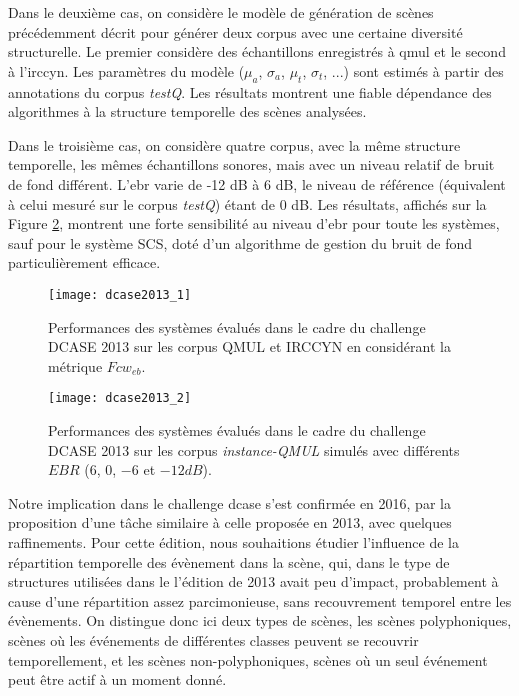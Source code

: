 Dans le deuxième cas, on considère le modèle de génération de scènes précédemment décrit pour générer deux corpus avec une certaine diversité structurelle. Le premier considère des échantillons enregistrés à qmul et le second à l'irccyn. Les paramètres du modèle ($\mu_a$, $\sigma_a$, $\mu_t$, $\sigma_t$, ...) sont estimés à partir des annotations du corpus \emph{testQ}. Les résultats montrent une fiable dépendance des algorithmes à la structure temporelle des scènes analysées.

Dans le troisième cas, on considère quatre corpus, avec la même structure temporelle, les mêmes échantillons sonores, mais avec un niveau relatif de bruit de fond différent. L'ebr varie de -12 dB à 6 dB, le niveau de référence (équivalent à celui mesuré sur le corpus \emph{testQ})  étant de 0 dB. Les résultats, affichés sur la Figure \ref{fig:ebr}, montrent une forte sensibilité au niveau d'ebr pour toute les systèmes, sauf pour le système SCS, doté d'un algorithme de gestion du bruit de fond particulièrement efficace.

\begin{figure}[t]
\texttt{[image: dcase2013\_1]}
\caption{Performances des systèmes évalués dans le cadre du challenge DCASE 2013 sur les corpus QMUL et IRCCYN en considérant la métrique $Fcw_{eb}$.}
\label{fig:irccyn}
\end{figure}

\begin{figure}[t]
\begin{center}
\texttt{[image: dcase2013\_2]}
\caption{Performances des systèmes évalués dans le cadre du challenge DCASE 2013 sur les corpus \emph{instance-QMUL} simulés avec différents $EBR$ ($6$, $0$, $-6$ et $-12dB$).}
\label{fig:ebr}
\end{center}
\end{figure}

Notre implication dans le challenge dcase s'est confirmée en 2016\cite{mesa}, par la proposition d'une tâche similaire à celle proposée en 2013, avec quelques raffinements. Pour cette édition, nous souhaitions étudier l'influence de la répartition temporelle des évènement dans la scène, qui, dans le type de structures utilisées dans le l'édition de 2013 avait peu d'impact, probablement à cause d'une répartition assez parcimonieuse, sans recouvrement temporel entre les évènements. On distingue donc ici deux types de scènes, les scènes polyphoniques, scènes où les événements de différentes classes peuvent se recouvrir temporellement, et les scènes non-polyphoniques, scènes où un seul événement peut être actif à un moment donné.

